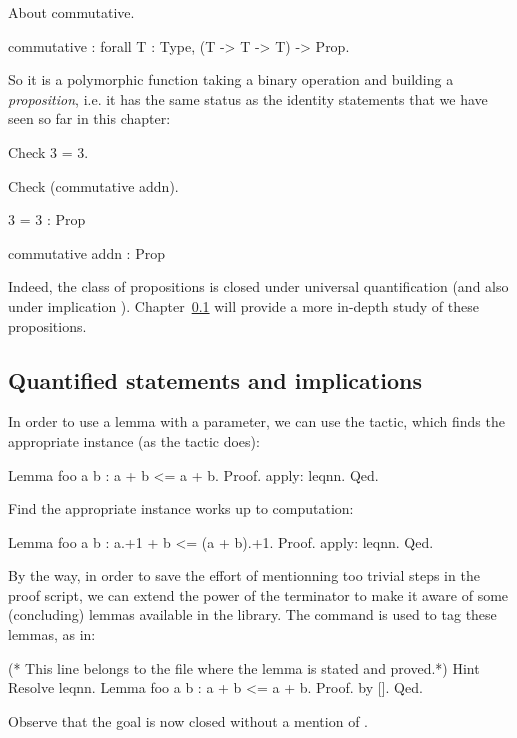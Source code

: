 \begin{coq}{}{}
About commutative.
\end{coq}
\begin{coqout}{}{}
commutative : forall T : Type, (T -> T -> T) -> Prop.
\end{coqout}

So it is a polymorphic function taking a binary operation and
building a \emph{proposition}, i.e. it has the same status as the
identity statements that we have seen so far in this chapter:

\begin{coq}{}{}
Check 3 = 3.

Check (commutative addn).
\end{coq}
\begin{coqout}{}{}
3 = 3 : Prop

commutative addn : Prop
\end{coqout}
Indeed, the class of propositions is closed under universal quantification
 (and also under implication \C{->}). Chapter~\ref{} will
provide a more in-depth study of these propositions.

\subsection{Quantified statements and implications}

In order to use a lemma with a parameter, we can use the 
tactic, which finds the appropriate instance (as the 
tactic does):

\begin{coq}{}{}
Lemma foo a b : a + b <= a + b.
Proof.
apply: leqnn.
Qed.
\end{coq}

Find the appropriate instance works up to computation:

\begin{coq}{}{}
Lemma foo a b : a.+1 + b <= (a + b).+1.
Proof.
apply: leqnn.
Qed.
\end{coq}

By the way, in order to save the effort of mentionning too trivial
steps in the proof script, we can extend the power of the 
terminator to make it aware of some (concluding) lemmas available in
the library. The  command is used to tag these lemmas,
as in:

\begin{coq}{}{}
(* This line belongs to the file where the lemma is stated and proved.*)
Hint Resolve leqnn.
Lemma foo a b : a + b <= a + b.
Proof.
by [].
Qed.
\end{coq}
Observe that the goal is now closed without a mention of .


